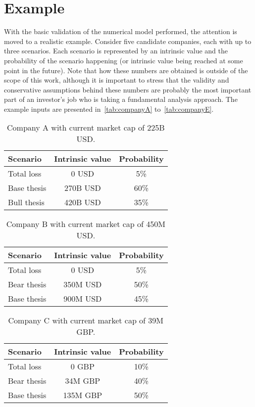 \documentclass{article}
\begin{document}
\section{Example}
\label{sec:example}

\noindent With the basic validation of the numerical model performed, the
attention is moved to a realistic example. Consider five candidate companies,
each with up to three scenarios. Each scenario is represented by an intrinsic
value and the probability of the scenario happening (or intrinsic value being
reached at some point in the future). Note that how these numbers are obtained
is outside of the scope of this work, although it is important to stress that
the validity and conservative assumptions behind these numbers are probably the
most important part of an investor's job who is taking a fundamental analysis
approach. The example inputs are presented in~\autoref{tab:companyA}
to~\autoref{tab:companyE}.

\begin{table}[!ht]
\caption{Company A with current market cap of 225B USD.}
\vspace{0.25cm}
\centering
\begin{tabular}{l|c|c}
Scenario & Intrinsic value & Probability \\
\hline
Total loss & 0 USD & 5\% \\
Base thesis & 270B USD & 60\% \\
Bull thesis & 420B USD & 35\% \\
\end{tabular}%
\label{tab:companyA}%
\end{table}%

\begin{table}[!ht]
\caption{Company B with current market cap of 450M USD.}
\vspace{0.25cm}
\centering
\begin{tabular}{l|c|c}
Scenario & Intrinsic value & Probability \\
\hline
Total loss& 0 USD & 5\% \\
Bear thesis & 350M USD & 50\% \\
Base thesis & 900M USD & 45\% \\
\end{tabular}%
\label{tab:companyB}%
\end{table}%

\begin{table}[!ht]
\caption{Company C with current market cap of 39M GBP.}
\vspace{0.25cm}
\centering
\begin{tabular}{l|c|c}
Scenario & Intrinsic value & Probability \\
\hline
Total loss & 0 GBP & 10\% \\
Bear thesis & 34M GBP & 40\% \\
Base thesis & 135M GBP & 50\% \\
\end{tabular}%
\label{tab:companyC}%
\end{table}%
\end{document}
